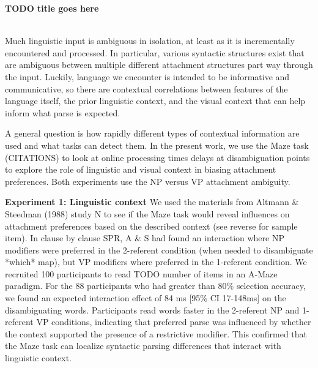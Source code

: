 \documentclass[11pt,a4paper]{article}
\renewcommand{\title}[1]{\textbf{#1}\\}
\newcommand{\authors}[1]{\iftoggle{anonymous}{\phantom{#1}}{#1}\\}
\begin{document}

\noindent\title{TODO title goes here}
\authors{Veronica Boyce (Stanford University, vboyce@stanford.edu), Roger P. Levy (MIT)} 
\newline
%


Much linguistic input is ambiguous in isolation, at least as it is incrementally encountered and processed. In particular, various syntactic structures exist that are ambiguous between multiple different attachment structures part way through the input.
Luckily, language we encounter is intended to be informative and communicative, so there are contextual correlations between features of the language itself, the prior linguistic context, and the visual context that can help inform what parse is expected. 

A general question is how rapidly different types of contextual information are used and what tasks can detect them. In the present work, we use the Maze task (CITATIONS) to look at online processing times delays at disambiguation points to explore the role of linguistic and visual context in biasing attachment preferences. Both experiments use the NP versus VP attachment ambiguity. 

\medskip
\noindent\textbf{Experiment 1: Linguistic context} We used the materials from Altmann \& Steedman (1988) study N to see if the Maze task would reveal influences on attachment preferences based on the described context (see reverse for sample item). In clause by clause SPR, A \& S had found an interaction where NP modifiers were preferred in the 2-referent condition (when needed to disambiguate *which* map), but VP modifiers where preferred in the 1-referent condition. We recruited 100 participants to read TODO number of items in an A-Maze paradigm. For the 88 participants who had greater than 80\% selection accuracy, we found an expected interaction effect of 84 ms [95\% CI 17-148ms] on the disambiguating words. Participants read words faster in the 2-referent NP and 1-referent VP conditions, indicating that preferred parse was influenced by whether the context supported the presence of a restrictive modifier.  This confirmed that the Maze task can localize syntactic parsing differences that interact with linguistic context. 
\end{document}

